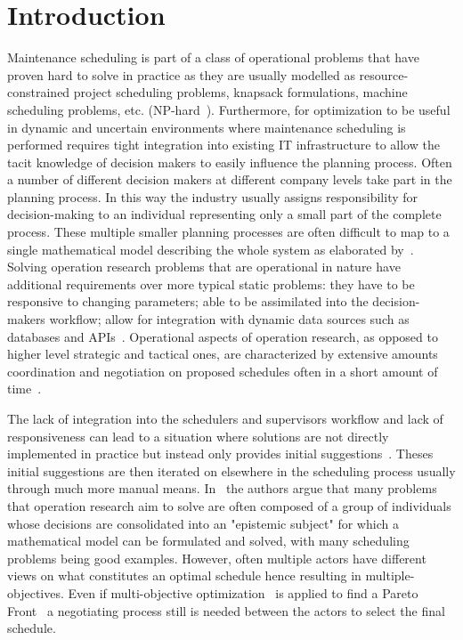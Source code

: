 \section{Introduction}
Maintenance scheduling is part of a class of operational problems that have proven hard to solve in practice as they
are usually modelled as resource-constrained project scheduling problems, knapsack formulations, machine scheduling problems, etc. (NP-hard~\citep{garey1979computers}).
Furthermore, for optimization to be useful in dynamic and uncertain environments where maintenance scheduling
is performed requires tight integration into existing IT infrastructure to allow the tacit knowledge of decision makers to easily influence
the planning process. Often a number of different decision makers at different company levels take part in the
planning process. In this way the industry usually assigns responsibility for decision-making to an individual
representing only a small part of the complete process. These multiple smaller planning processes are often difficult
to map to a single mathematical model describing the whole system as elaborated by~\citep{barthelemy2002human}. Solving
operation research problems that are operational in nature have additional requirements over more typical static
problems: they have to be responsive to changing parameters; able to be assimilated into the decision-makers workflow;
allow for integration with dynamic data sources such as databases and APIs~\citep{meignan_review_2015}. Operational
aspects of operation research, as opposed to higher level strategic and tactical ones, are characterized by extensive
amounts coordination and negotiation on proposed schedules often in a short amount of time~\citep{palmerMaintenancePlanningScheduling2019}.

The lack of integration into the schedulers and supervisors workflow and lack of responsiveness can lead to a situation
where solutions are not directly implemented in practice but instead only provides initial suggestions~\citep{meignan_review_2015}.
Theses initial suggestions are then iterated on elsewhere in the scheduling process usually through much more manual means.
In~\citep{barthelemy2002human} the authors argue that many problems that operation research aim to solve are often composed
of a group of individuals whose decisions are consolidated into an "epistemic subject" for which a mathematical model can be formulated
and solved, with many scheduling problems being good examples. However, often multiple actors have different
views on what constitutes an optimal schedule hence resulting in multiple-objectives. Even if multi-objective
optimization~\citep{ehrgott2002multiple} is applied to find a Pareto Front~\citep{Pareto1897} a negotiating process
still is needed between the actors to select the final schedule.

